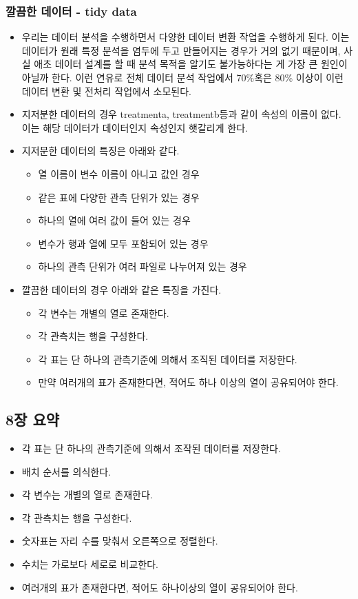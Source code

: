 \documentclass{article}
\begin{document}
\subsubsection{깔끔한 데이터 - tidy data}
\begin{itemize}
    \item 우리는 데이터 분석을 수행하면서 다양한 데이터 변환 작업을 수행하게 된다. 이는 데이터가 원래 특정 분석을 염두에 두고 만들어지는 경우가 거의 없기 때문이며, 사실 애초 데이터 설계를 할 때 분석 목적을 알기도 불가능하다는 게 가장 큰 원인이 아닐까 한다. 이런 연유로 전체 데이터 분석 작업에서 70\%혹은 80\% 이상이 이런 데이터 변환 및 전처리 작업에서 소모된다.
    \item 지저분한 데이터의 경우 treatmenta, treatmentb등과 같이 속성의 이름이 없다. 이는 해당 데이터가 데이터인지 속성인지 햇갈리게 한다.
    \item 지저분한 데이터의 특징은 아래와 같다.
    \begin{itemize}
        \item 열 이름이 변수 이름이 아니고 값인 경우
        \item 같은 표에 다양한 관측 단위가 있는 경우
        \item 하나의 열에 여러 값이 들어 있는 경우
        \item 변수가 행과 열에 모두 포함되어 있는 경우
        \item 하나의 관측 단위가 여러 파일로 나누어져 있는 경우
    \end{itemize}
    \item 깔끔한 데이터의 경우 아래와 같은 특징을 가진다.
    \begin{itemize}
        \item 각 변수는 개별의 열로 존재한다.
        \item 각 관측치는 행을 구성한다.
        \item 각 표는 단 하나의 관측기준에 의해서 조직된 데이터를 저장한다.
        \item 만약 여러개의 표가 존재한다면, 적어도 하나 이상의 열이 공유되어야 한다.
    \end{itemize}
\end{itemize}

\subsection{8장 요약}
\begin{itemize}
    \item 각 표는 단 하나의 관측기준에 의해서 조작된 데이터를 저장한다.
    \item 배치 순서를 의식한다.
    \item 각 변수는 개별의 열로 존재한다.
    \item 각 관측치는 행을 구성한다.
    \item 숫자표는 자리 수를 맞춰서 오른쪽으로 정렬한다.
    \item 수치는 가로보다 세로로 비교한다.
    \item 여러개의 표가 존재한다면, 적어도 하나이상의 열이 공유되어야 한다.
\end{itemize}
\end{document}
